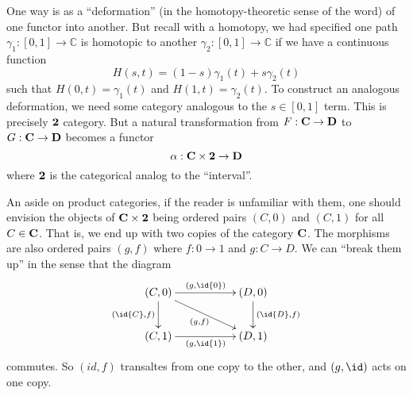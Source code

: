 One way is as a ``deformation'' (in the homotopy-theoretic sense
of the word) of one functor into another. But recall with a
homotopy, we had specified one path
$\gamma_{1}:[0,1]\to\mathbb{C}$ is homotopic to another
$\gamma_{2}:[0,1]\to\mathbb{C}$ if we have a continuous function
\begin{equation}
H(s,t)=(1-s)\gamma_{1}(t)+s\gamma_{2}(t)
\end{equation}
such that $H(0,t)=\gamma_{1}(t)$ and $H(1,t)=\gamma_{2}(t)$. To
construct an analogous deformation, we need some category
analogous to the $s\in[0,1]$ term. This is precisely $\mathbf{2}$
category. But a natural transformation from $F:\mathbf{C}\to\mathbf{D}$
to $G:\mathbf{C}\to\mathbf{D}$ becomes a functor
\begin{equation}
\alpha:\mathbf{C}\times\mathbf{2}\to\mathbf{D}
\end{equation}
where $\mathbf{2}$ is the categorical analog to the
``interval''. 

An aside on product categories, if the reader is unfamiliar with
them, one should envision the objects of $\mathbf{C}\times\mathbf{2}$
being ordered pairs $(C,0)$ and $(C,1)$ for all
$C\in\mathbf{C}$. That is, we end up with two copies of the category
$\mathbf{C}$. The morphisms are also ordered pairs $(g,f)$ where
$f:0\to{}1$ and $g:C\to{}D$. We can ``break them up'' in the
sense that the diagram
\begin{equation}
\vcenter{\xymatrix{
(C,0)\ar[d]_{(\id{C},f)}\ar[drr]_{(g,f)}\ar[rr]^{(g,\id{0})}&&(D,0)\ar[d]^{(\id{D},f)}\\
(C,1)\ar[rr]_{(g,\id{1})}&&(D,1)
}}
\end{equation}
commutes. So $(id,f)$ transaltes from one copy to the other, and
$(g,\id)$ acts on one copy.

